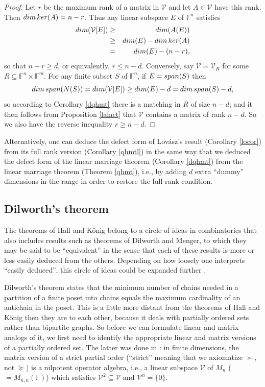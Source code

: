 \documentclass[10pt,a4paper]{amsart}
\begin{document}
\begin{proof}
Let $r$ be the maximum rank of a matrix in $\mathcal{V}$ and let $A \in \mathcal{V}$ have this rank. Then ${\rm dim}\, {\rm ker}(A) = n - r$. Thus any linear subspace $E$ of $\mathbb{F}^n$ satisfies
\begin{eqnarray*}
{\rm dim}(\mathcal{V}[E]) &\geq& {\rm dim}(A(E))\\
&\geq& {\rm dim}(E) - {\rm dim}\, {\rm ker}(A)\\
&=& {\rm dim}(E) - (n - r),
\end{eqnarray*}
so that $n - r \geq d$, or equivalently, $r \leq n - d$. Conversely, say $\mathcal{V} = \mathcal{V}_R$ for some $R \subseteq \mathbb{F}^n\times\mathbb{F}^m$. For any finite subset $S$ of $\mathbb{F}^n$, if $E = {\rm span}(S)$ then $${\rm dim}\, {\rm span}(N(S)) = {\rm dim}(\mathcal{V}[E]) \geq {\rm dim}(E) - d = {\rm dim}\, {\rm span}(S) - d,$$ so according to Corollary \ref{dqhmt} there is a matching in $R$ of size $n - d$; and it then follows from Proposition \ref{lafact} that $\mathcal{V}$ contains a matrix of rank $n - d$. So we also have the reverse inequality $r \geq n - d$.
\end{proof}

Alternatively, one can deduce the defect form of Lovász's result (Corollary \ref{locor}) from its full rank version (Corollary \ref{qhmtl}) in the same way that we deduced the defect form of the linear marriage theorem (Corollary \ref{dqhmt}) from the linear marriage theorem (Theorem \ref{qhmt}), i.e., by adding $d$ extra ``dummy'' dimensions in the range in order to restore the full rank condition.

\subsection{Dilworth's theorem}

The theorems of Hall and Kőnig belong to a circle of ideas in combinatorics that also includes results such as theorems of Dilworth and Menger, to which they may be said to be ``equivalent'' in the sense that each of these results is more or less easily deduced from the others. Depending on how loosely one interprets ``easily deduced'', this circle of ideas could be expanded further \cite{cameron}. 

Dilworth's theorem states that the minimum number of chains needed in a partition of a finite poset into chains equals the maximum cardinality of an antichain in the poset. This is a little more distant from the theorems of Hall and Kőnig then they are to each other, because it deals with partially ordered sets rather than bipartite graphs. So before we can formulate linear and matrix analogs of it, we first need to identify the appropriate linear and matrix versions of a partially ordered set. The latter was done in \cite{weaver}: in finite dimensions, the matrix version of a strict partial order (``strict'' meaning that we axiomatize $\succ$, not $\succeq$) is a nilpotent operator algebra, i.e., a linear subspace $\mathcal{V}$ of $M_n$ ($= M_{n,n}(\mathbb{F})$) which satisfies $\mathcal{V}^2 \subseteq \mathcal{V}$ and $\mathcal{V}^n = \{0\}$.
\end{document}
